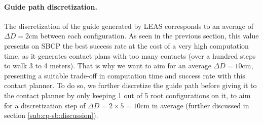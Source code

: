 \paragraph{Guide path discretization.}
The discretization of the guide generated by LEAS corresponds to an average of $\Delta D=2$cm between each configuration. 
As seen in the previous section, this value presents on SBCP the best success rate at the cost of a very high computation time, as it generates contact plans with too many contacts (over a hundred steps to walk 3 to 4 meters).
That is why we want to aim for an average $\Delta D=10$cm, presenting a suitable trade-off in computation time and success rate with this contact planner.
To do so, we further discretize the guide path before giving it to the contact planner by only keeping 1 out of 5 root configurations on it, to aim for a discretization step of $\Delta D = 2 \times 5 = 10$cm in average (further discussed in section \ref{sub:cp-sb:discussion}).



